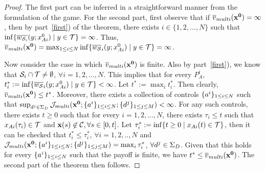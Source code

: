 \begin{proof}
The first part can be inferred in a straightforward manner from the formulation of the game.
For the second part, first observe that if $\overline{v}_{multi}(\mathbf{x^0}) = \infty$, then by part~\ref{first}) of the theorem, there exists $i \in \{1,2,...,N\}$ such that $\inf \{\overline{w_{\mathcal{S}_i}}(y;x_{Ai}^0) \mid {y\in\mathcal{T}}\} = \infty$.
Thus, $\overline{v}_{multi}(\mathbf{x^0}) = \max_{1 \le i \le N}  \inf \{\overline{w_{\mathcal{S}}}_{i}(y;x_{Ai}^0) \mid {y\in\mathcal{T}}\} =\infty$.

Now consider the case in which $\overline{v}_{multi}(\mathbf{x^0})$ is finite.
Also by part~\ref{first}), we know that $\mathcal{S}_{i} \cap \mathcal{T} \neq \emptyset$, $\forall i = 1,2,...,N$.
This implies that for every $P^i_A$, $t_i^* := \inf \{\overline{w_{\mathcal{S}}}_{i}(y;x_{Ai}^0) \mid {y\in\mathcal{T}}\} < \infty$.  Let $t^* := \max_{i} t_i^*$.  Then clearly, $\overline{v}_{multi}(\mathbf{x^0}) \le t^*$.  Moreover, there exists a collection of controls $\{{a^{i}}\}_{1\le i \le N}$ such that $\sup_{d^{j}\in\Sigma_D}  \mathcal{J}_{multi}(\mathbf{x^0};\{{a^{i}}\}_{1\le i \le N};\{{d^{j}}\}_{1\le j \le M}) < \infty$.  For any such controls, there exists $t \ge 0$ such that for every $i=1,2,...,N$, there exists $\tau_i \le t$ such that $x_{Ai}(\tau_i)\in\mathcal{T}$ and 
$\mathbf{x}(s)\not\in\mathcal{C}, \forall s\in [0,t]$.  Let $\tau_i^* := \inf \{t \ge 0 \mid x_{Ai}(t) \in \mathcal{T}\}$, then it can be checked that $t_i^* \leq \tau_i^*$, $\forall i = 1,2,..,N$ and $\mathcal{J}_{multi}(\mathbf{x^0};\{{a^{i}}\}_{1\le i \le N};\{{d^{j}}\}_{1\le j \le M}) = \max_{i} \tau_i^*$, $\forall d^{j}\in\Sigma_D$.  Given that this holds for every $\{{a^{i}}\}_{1\le i \le N}$ such that the payoff is finite, we have $t^* \leq \overline{v}_{multi}(\mathbf{x^0})$.  The second part of the theorem then follows.
\end{proof}

